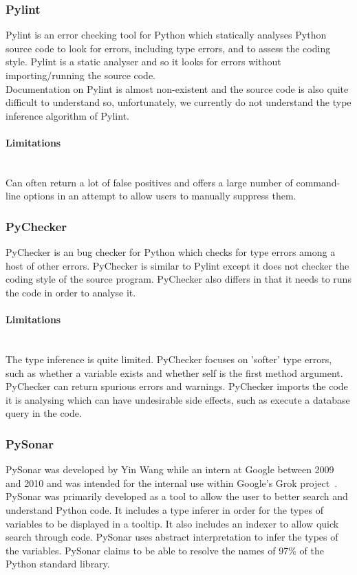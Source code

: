 \documentclass[12pt, titlepage]{article}
\begin{document}
\subsubsection{Pylint}
Pylint is an error checking tool for Python which statically analyses Python source code to look for errors, including type errors, and to assess the coding style. Pylint is a static analyser and so it looks for errors without importing/running the source code. \\
Documentation on Pylint is almost non-existent and the source code is also quite difficult to understand so, unfortunately, we currently do not understand the type inference algorithm of Pylint.
\paragraph{Limitations}\mbox{}\\
Can often return a lot of false positives and offers a large number of command-line options in an attempt to allow users to manually suppress them.

\subsubsection{PyChecker}
PyChecker is an bug checker for Python which checks for type errors among a host of other errors. PyChecker is similar to Pylint except it does not checker the coding style of the source program. PyChecker also differs in that it needs to runs the code in order to analyse it.
\paragraph{Limitations}\mbox{}\\
The type inference is quite limited. PyChecker focuses on 'softer' type errors, such as whether a variable exists and whether self is the first method argument. \\
PyChecker can return spurious errors and warnings. PyChecker imports the code it is analysing which can have undesirable side effects, such as execute a database query in the code.

\subsubsection{PySonar}
PySonar was developed by Yin Wang while an intern at Google between 2009 and 2010 and was intended for the internal use within Google's Grok project~\cite{pySonar}. PySonar was primarily developed as a tool to allow the user to better search and understand Python code. It includes a type inferer in order for the types of variables to be displayed in a tooltip. It also includes an indexer to allow quick search through code. PySonar uses abstract interpretation to infer the types of the variables. PySonar claims to be able to resolve the names of 97\% of the Python standard library.
\end{document}
